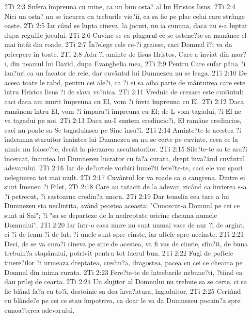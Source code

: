 2Ti 2:3  Sufera împreuna cu mine, ca un bun osta? al lui Hristos Iisus.
2Ti 2:4  Nici un osta? nu se încurca cu treburile vie?ii, ca sa fie pe plac celui care strânge oaste.
2Ti 2:5  Iar când se lupta cineva, la jocuri, nu ia cununa, daca nu s-a luptat dupa regulile jocului.
2Ti 2:6  Cuvine-se ca plugarul ce se ostene?te sa manânce el mai întâi din roade.
2Ti 2:7  În?elege cele ce-?i graiesc, caci Domnul î?i va da pricepere în toate.
2Ti 2:8  Adu-?i aminte de Iisus Hristos, Care a înviat din mor?i, din neamul lui David, dupa Evanghelia mea,
2Ti 2:9  Pentru Care sufar pâna ?i lan?uri ca un facator de rele, dar cuvântul lui Dumnezeu nu se leaga.
2Ti 2:10  De aceea toate le rabd, pentru cei ale?i, ca ?i ei sa aiba parte de mântuirea care este întru Hristos Iisus ?i de slava ve?nica.
2Ti 2:11  Vrednic de crezare este cuvântul: caci daca am murit împreuna cu El, vom ?i învia împreuna cu El.
2Ti 2:12  Daca ramânem întru El, vom ?i împara?i împreuna cu El; de-L vom tagadui, ?i El ne va tagadui pe noi.
2Ti 2:13  Daca nu-I suntem credincio?i, El ramâne credincios, caci nu poate sa Se tagaduiasca pe Sine însu?i.
2Ti 2:14  Aminte?te-le acestea ?i îndeamna staruitor înaintea lui Dumnezeu sa nu se certe pe cuvinte, ceea ce la nimic nu folose?te, decât la pierzarea ascultatorilor.
2Ti 2:15  Sile?te-te sa te ara?i încercat, înaintea lui Dumnezeu lucrator cu fa?a curata, drept înva?ând cuvântul adevarului.
2Ti 2:16  Iar de de?artele vorbiri lume?ti fere?te-te, caci ele vor spori nelegiuirea tot mai mult.
2Ti 2:17  Cuvântul lor va roade ca o cangrena. Dintre ei sunt Imeneu ?i Filet,
2Ti 2:18  Care au ratacit de la adevar, zicând ca învierea s-a ?i petrecut, ?i rastoarna credin?a unora.
2Ti 2:19  Dar temelia cea tare a lui Dumnezeu sta neclintita, având pecetea aceasta: "Cunoscut-a Domnul pe cei ce sunt ai Sai"; ?i "sa se departeze de la nedreptate oricine cheama numele Domnului".
2Ti 2:20  Iar într-o casa mare nu sunt numai vase de aur ?i de argint, ci ?i de lemn ?i de lut; ?i unele sunt spre cinste, iar altele spre necinste.
2Ti 2:21  Deci, de se va cura?i cineva pe sine de acestea, va fi vas de cinste, sfin?it, de buna trebuin?a stapânului, potrivit pentru tot lucrul bun.
2Ti 2:22  Fugi de poftele tinere?ilor ?i urmeaza dreptatea, credin?a, dragostea, pacea cu cei ce cheama pe Domnul din inima curata.
2Ti 2:23  Fere?te-te de întrebarile nebune?ti, ?tiind ca dau prilej de cearta.
2Ti 2:24  Un slujitor al Domnului nu trebuie sa se certe, ci sa fie blând fa?a cu to?i, destoinic sa dea înva?atura, îngaduitor,
2Ti 2:25  Certând cu blânde?e pe cei ce stau împotriva, ca doar le va da Dumnezeu pocain?a spre cunoa?terea adevarului,
